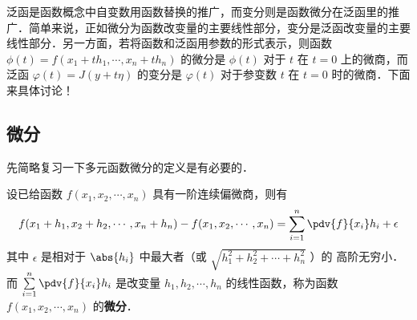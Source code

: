 
泛函是函数概念中自变数用函数替换的推广，而变分则是函数微分在泛函里的推广．简单来说，正如微分为函数改变量的主要线性部分，变分是泛函改变量的主要线性部分．另一方面，若将函数和泛函用参数的形式表示，则函数$\phi(t)=f(x_1+th_1,\cdots,x_n+th_n) $ 的微分是 $\phi(t)$ 对于 $t$ 在 $t=0$ 上的微商，而泛函 $\varphi(t)=J(y+t\eta)$ 的变分是 $\varphi(t)$ 对于参变数 $t$ 在 $t=0$ 时的微商．下面来具体讨论！
\subsection{微分}
先简略复习一下多元函数微分的定义是有必要的．

设已给函数 $f(x_1,x_2,\cdots,x_n)$ 具有一阶连续偏微商，则有
\begin{equation}
f(x_1+h_1,x_2+h_2,\cdots,x_n+h_n)-f(x_1,x_2,\cdots,x_n)=\sum_{i=1}^{n} \pdv{f}{x_i}h_i+\epsilon
\end{equation}
其中 $\epsilon$ 是相对于 $\abs{h_i}$ 中最大者（或 $\sqrt{h_1^2+h_2^2+\cdots+h_n^2}$ ）的 高阶无穷小．而 $\sum\limits_{i=1}^{n} \pdv{f}{x_i}h_i$ 是改变量 $h_1,h_2,\cdots,h_n$ 的线性函数，称为函数 $f(x_1,x_2,\cdots,x_n)$ 的\textbf{微分}．